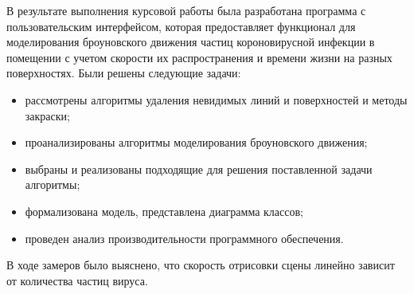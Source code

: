 \Conclusion %

В результате выполнения курсовой работы была разработана программа с пользовательским интерфейсом, которая предоставляет функционал для моделирования броуновского движения частиц короновирусной инфекции в помещении с учетом скорости их распространения и времени жизни на разных поверхностях.
Были решены следующие задачи:
\begin{itemize}
	\item рассмотрены алгоритмы удаления невидимых линий и поверхностей и методы закраски;
	\item проанализированы алгоритмы моделирования броуновского движения;
	\item выбраны и реализованы подходящие для решения поставленной задачи алгоритмы;
	\item формализована модель, представлена диаграмма классов;
	\item проведен анализ производительности программного обеспечения.
\end{itemize}

В ходе замеров было выяснено, что скорость отрисовки сцены линейно зависит от количества частиц вируса.